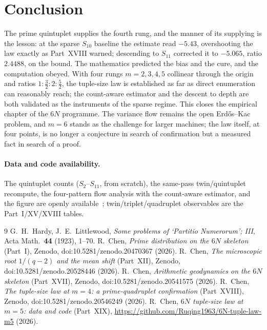 \documentclass[11pt]{article}
\begin{document}
\section{Conclusion}

The prime quintuplet supplies the fourth rung, and the manner of its supplying is
the lesson: at the sparse $S_{10}$ baseline the estimate read $-5.43$, overshooting
the law exactly as Part~XVIII warned; descending to $S_{11}$ corrected it to
$-5.065$, ratio $2.4488$, on the bound. The mathematics predicted the bias and
the cure, and the computation obeyed. With four rungs $m=2,3,4,5$ collinear
through the origin and ratios $1:\tfrac32:2:\tfrac52$, the tuple-size law is
established as far as direct enumeration can reasonably reach; the count-aware
estimator and the descent to depth are both validated as the instruments of the
sparse regime. This closes the empirical chapter of the $6N$ programme. The
variance flow remains the open Erd\H{o}s--Kac problem, and $m=6$ stands as the
challenge for larger machines; the law itself, at four points, is no longer a
conjecture in search of confirmation but a measured fact in search of a proof.

\paragraph{Data and code availability.}
The quintuplet counts ($S_2$--$S_{11}$, from scratch), the same-pass twin/quintuplet
recompute, the four-pattern flow analysis with the count-aware estimator, and the
figure are openly available~\cite{repo}; twin/triplet/quadruplet observables are
the Part~I/XV/XVIII tables.

\begin{thebibliography}{9}
 G.~H.~Hardy, J.~E.~Littlewood, \emph{Some problems of `Partitio
Numerorum'; III}, Acta Math.\ \textbf{44} (1923), 1--70.
 R.~Chen, \emph{Prime distribution on the $6N$ skeleton} (Part~I),
Zenodo, doi:10.5281/zenodo.20470367 (2026).
 R.~Chen, \emph{The microscopic root $1/(q-2)$ and the mean
shift} (Part~XII), Zenodo, doi:10.5281/zenodo.20528446 (2026).
 R.~Chen, \emph{Arithmetic geodynamics on the $6N$ skeleton}
(Part~XVII), Zenodo, doi:10.5281/zenodo.20541575 (2026).
 R.~Chen, \emph{The tuple-size law at $m=4$: a prime-quadruplet
confirmation} (Part~XVIII), Zenodo, doi:10.5281/zenodo.20546249 (2026).
 R.~Chen, \emph{$6N$ tuple-size law at $m=5$: data and code}
(Part~XIX), \url{https://github.com/Ruqing1963/6N-tuple-law-m5} (2026).
\end{thebibliography}
\end{document}

